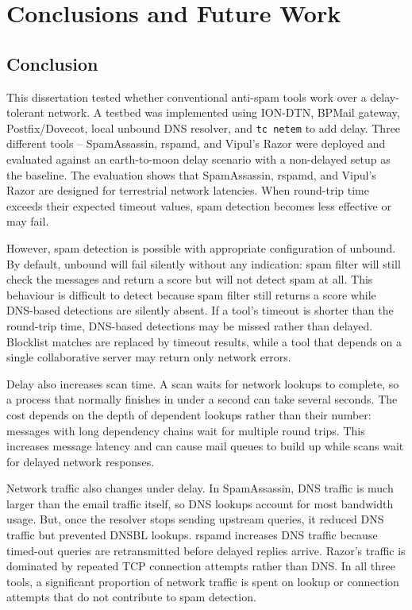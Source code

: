 \chapter{Conclusions and Future Work}
\section{Conclusion}

This dissertation tested whether conventional anti-spam tools work over a
delay-tolerant network. A testbed was implemented using ION-DTN, BPMail gateway, Postfix/Dovecot, local unbound DNS resolver, and \texttt{tc netem} to add delay. Three different tools – SpamAssassin, rspamd, and Vipul's Razor were deployed and evaluated against an earth-to-moon delay scenario with a non-delayed setup as the baseline. The evaluation shows that SpamAssassin, rspamd, and Vipul's Razor are designed for terrestrial network latencies. When round-trip time exceeds their expected timeout values, spam detection becomes less effective or may fail.

However, spam detection is possible with appropriate configuration of unbound. By default, unbound will fail silently without any indication: spam filter will still check the messages and return a score but will not detect spam at all. This behaviour is difficult to detect because spam filter still returns a score while DNS-based detections are silently absent. If a tool's timeout is shorter than the round-trip time, DNS-based detections may be missed rather than delayed. Blocklist matches are replaced by timeout results, while a tool that depends on a single collaborative server may return only network errors.

Delay also increases scan time. A scan waits for network lookups to complete, so a process that normally finishes in under a second can take several seconds. The cost depends on the depth of dependent lookups rather than their number: messages with long dependency chains wait for multiple round trips. This increases message latency and can cause mail queues to build up while scans wait for delayed network responses.

Network traffic also changes under delay. In SpamAssassin, DNS traffic is much larger than the email traffic itself, so DNS lookups account for most bandwidth usage. But, once the resolver stops sending upstream queries, it reduced DNS traffic but prevented DNSBL lookups.  rspamd increases DNS traffic because timed-out queries are retransmitted before delayed replies arrive. Razor's traffic is dominated by repeated TCP connection attempts rather than DNS. In all three tools, a significant proportion of network traffic is spent on lookup or connection attempts that do not contribute to spam detection.


